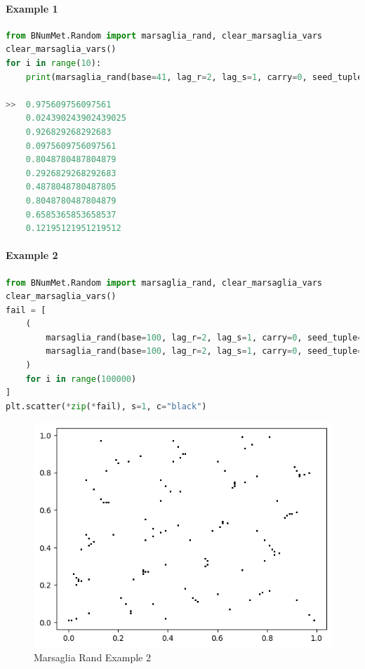 \paragraph{Example 1}{
\begin{lstlisting}[language=Python]
from BNumMet.Random import marsaglia_rand, clear_marsaglia_vars
clear_marsaglia_vars()
for i in range(10):
    print(marsaglia_rand(base=41, lag_r=2, lag_s=1, carry=0, seed_tuple=(0, 1)))

>>  0.975609756097561
    0.024390243902439025
    0.926829268292683
    0.0975609756097561
    0.8048780487804879
    0.2926829268292683
    0.4878048780487805
    0.8048780487804879
    0.6585365853658537
    0.12195121951219512
\end{lstlisting}
}
\paragraph{Example 2}{
\begin{lstlisting}[language=Python]
from BNumMet.Random import marsaglia_rand, clear_marsaglia_vars
clear_marsaglia_vars()
fail = [
    (
        marsaglia_rand(base=100, lag_r=2, lag_s=1, carry=0, seed_tuple=(0, 1)),
        marsaglia_rand(base=100, lag_r=2, lag_s=1, carry=0, seed_tuple=(0, 1)),
    )
    for i in range(100000)
]
plt.scatter(*zip(*fail), s=1, c="black")
\end{lstlisting}
\begin{figure}[H]
    \centering
    \includegraphics{Include/Images/Thesis/Documentation/Randomness/Marsaglia Rand Example 2.png}
    \caption{Marsaglia Rand Example 2}
    \label{fig:Marsaglia Rand Example 2}
\end{figure}
}
